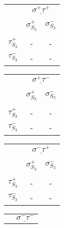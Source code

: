 \documentclass[12pt]{article}
\begin{document}
\begin{center}
\begin{tabular}{ c | c | c |}
\multicolumn{1}{c}{} &\multicolumn{2}{c}{$\underline{\sigma^+ \tau^+}$} \\[-1em]
\multicolumn{1}{c}{} & \multicolumn{1}{c}{} & \multicolumn{1}{c}{} \\
\multicolumn{1}{c}{} & \multicolumn{1}{c}{$\sigma_{S_3}^+$} & \multicolumn{1}{c}{$\sigma_{S_3}^-$} \\[-1em]
\multicolumn{1}{c}{} & \multicolumn{1}{c}{} & \multicolumn{1}{c}{} \\
\cline{2-3} $\tau_{S_3}^+$ & - & - \\
\cline{2-3} $\tau_{S_3}^-$ & - & - \\
\cline{2-3}
\end{tabular} 
\hspace{.4cm}
\begin{tabular}{ c | c | c |}
\multicolumn{1}{c}{} &\multicolumn{2}{c}{$\underline{\sigma^+ \tau^-}$} \\[-1em]
\multicolumn{1}{c}{} & \multicolumn{1}{c}{} & \multicolumn{1}{c}{}\\
\multicolumn{1}{c}{} & \multicolumn{1}{c}{$\sigma_{S_3}^+$} & \multicolumn{1}{c}{$\sigma_{S_3}^-$} \\[-1em]
\multicolumn{1}{c}{} & \multicolumn{1}{c}{} & \multicolumn{1}{c}{} \\
\cline{2-3} $\tau_{S_3}^+$ & - & - \\
\cline{2-3} $\tau_{S_3}^-$ & - & - \\
\cline{2-3}
\end{tabular}
\hspace{.4cm}
\begin{tabular}{ c | c | c |}
\multicolumn{1}{c}{} &\multicolumn{2}{c}{$\underline{\sigma^- \tau^+}$} \\[-1em]
\multicolumn{1}{c}{} & \multicolumn{1}{c}{} & \multicolumn{1}{c}{}\\
\multicolumn{1}{c}{} & \multicolumn{1}{c}{$\sigma_{S_3}^+$} & \multicolumn{1}{c}{$\sigma_{S_3}^-$} \\[-1em]
\multicolumn{1}{c}{} & \multicolumn{1}{c}{} & \multicolumn{1}{c}{} \\
\cline{2-3} $\tau_{S_3}^+$ & - & - \\
\cline{2-3} $\tau_{S_3}^-$ & - & - \\
\cline{2-3}
\end{tabular}
\hspace{.4cm}
\begin{tabular}{ c | c | c |}
\multicolumn{1}{c}{} &\multicolumn{2}{c}{$\underline{\sigma^- \tau^-}$} \\[-1em]

\end{tabular}
\end{center}
\end{document}
